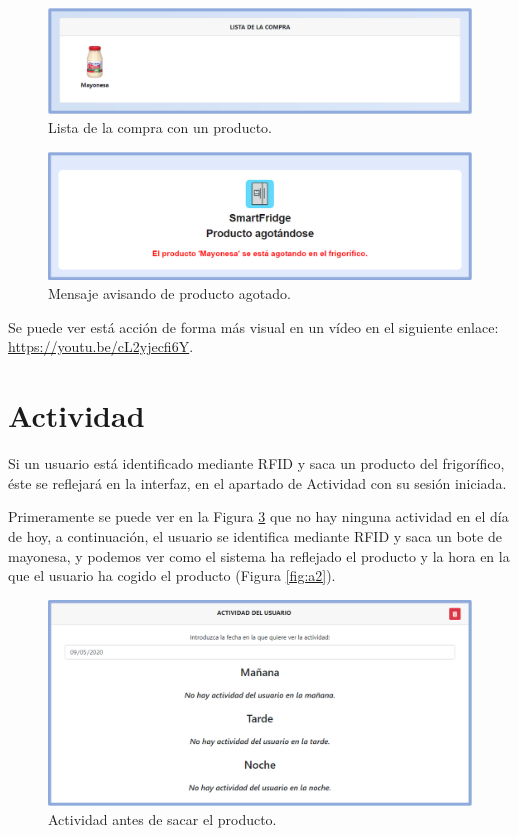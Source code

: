 \begin{figure}[h] 
    \centering
    \includegraphics[width=.80\textwidth]{capitulos/capitulo10/listacompra/4.png}
    \caption{Lista de la compra con un producto.}
    \label{fig:l4}
\end{figure}

\begin{figure}[h] 
    \centering
    \includegraphics[width=.80\textwidth]{capitulos/capitulo10/listacompra/5.png}
    \caption{Mensaje avisando de producto agotado.}
    \label{fig:l5}
\end{figure}

\newpage
Se puede ver está acción de forma más visual en un vídeo en el siguiente enlace: \url{https://youtu.be/cL2yjecfi6Y}.

\section{Actividad}
Si un usuario está identificado mediante RFID y saca un producto del frigorífico, éste se reflejará en la interfaz, en el apartado de Actividad con su sesión iniciada.

Primeramente se puede ver en la Figura \ref{fig:a1} que no hay ninguna actividad en el día de hoy, a continuación, el usuario se identifica mediante RFID y saca un bote de mayonesa, y podemos ver como el sistema ha reflejado el producto y la hora en la que el usuario ha cogido el producto (Figura \ref{fig:a2}).

\begin{figure}[h] 
    \centering
    \includegraphics[width=.70\textwidth]{capitulos/capitulo10/actividad/1.png}
    \caption{Actividad antes de sacar el producto.}
    \label{fig:a1}
\end{figure}

